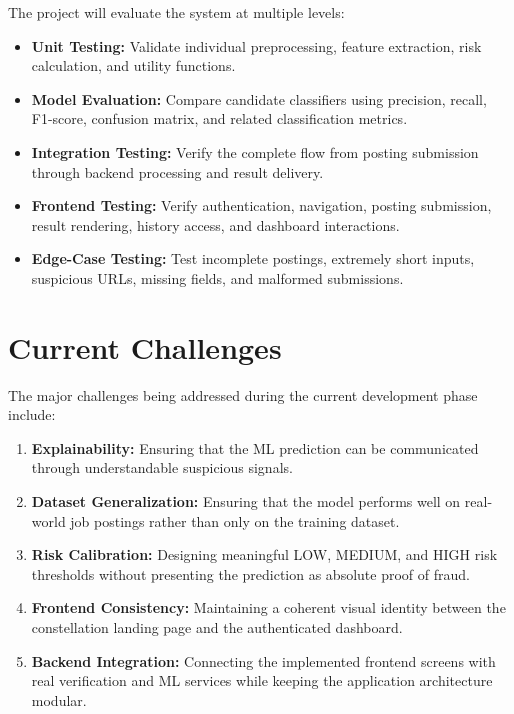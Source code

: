 \documentclass[12pt,a4paper]{report}
\begin{document}
The project will evaluate the system at multiple levels:

\begin{itemize}

    \item \textbf{Unit Testing:}
    Validate individual preprocessing, feature extraction, risk calculation, and utility functions.

    \item \textbf{Model Evaluation:}
    Compare candidate classifiers using precision, recall, F1-score, confusion matrix, and related classification metrics.

    \item \textbf{Integration Testing:}
    Verify the complete flow from posting submission through backend processing and result delivery.

    \item \textbf{Frontend Testing:}
    Verify authentication, navigation, posting submission, result rendering, history access, and dashboard interactions.

    \item \textbf{Edge-Case Testing:}
    Test incomplete postings, extremely short inputs, suspicious URLs, missing fields, and malformed submissions.

\end{itemize}


\section{Current Challenges}

The major challenges being addressed during the current development phase include:

\begin{enumerate}

    \item \textbf{Explainability:}
    Ensuring that the ML prediction can be communicated through understandable suspicious signals.

    \item \textbf{Dataset Generalization:}
    Ensuring that the model performs well on real-world job postings rather than only on the training dataset.

    \item \textbf{Risk Calibration:}
    Designing meaningful LOW, MEDIUM, and HIGH risk thresholds without presenting the prediction as absolute proof of fraud.

    \item \textbf{Frontend Consistency:}
    Maintaining a coherent visual identity between the constellation landing page and the authenticated dashboard.

    \item \textbf{Backend Integration:}
    Connecting the implemented frontend screens with real verification and ML services while keeping the application architecture modular.

\end{enumerate}
\end{document}
